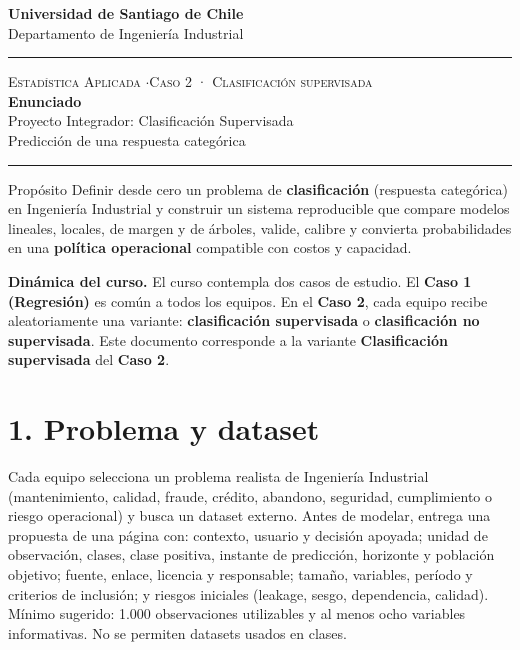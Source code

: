 \documentclass[11pt,letterpaper]{article}
\newcommand{\hrulethin}{\noindent\rule{\textwidth}{0.6pt}}
\begin{document}
\pagestyle{plain}
\begin{center}
    \textbf{\large Universidad de Santiago de Chile}\\[0.1cm]
    Departamento de Ingeniería Industrial
\end{center}
\vspace{0.15cm}\hrulethin\vspace{0.35cm}
\begin{center}
    {\scshape Estadística Aplicada \quad$\cdot$\quad Caso 2 · Clasificación supervisada}\\[0.35cm]
    {\LARGE \textbf{Enunciado}}\\[0.15cm]
    {\large Proyecto Integrador: Clasificación Supervisada}\\[0.2cm]
    Predicción de una respuesta categórica
\end{center}
\vspace{0.2cm}\hrulethin\vspace{0.4cm}
\begin{propbox}{Propósito}
Definir desde cero un problema de \textbf{clasificación} (respuesta categórica) en Ingeniería Industrial y
construir un sistema reproducible que compare modelos lineales, locales, de margen y de árboles, valide,
calibre y convierta probabilidades en una \textbf{política operacional} compatible con costos y capacidad.
\end{propbox}

\textbf{Dinámica del curso.} El curso contempla dos casos de estudio. El \textbf{Caso 1 (Regresión)} es común a todos los equipos. En el \textbf{Caso 2}, cada equipo recibe aleatoriamente una variante: \textbf{clasificación supervisada} o \textbf{clasificación no supervisada}. Este documento corresponde a la variante \textbf{Clasificación supervisada} del \textbf{Caso 2}.

\section*{1. Problema y dataset}
Cada equipo selecciona un problema realista de Ingeniería Industrial (mantenimiento, calidad, fraude, crédito, abandono, seguridad, cumplimiento o riesgo operacional) y busca un dataset externo. Antes de modelar, entrega una propuesta de una página con: contexto, usuario y decisión apoyada; unidad de observación, clases, clase positiva, instante de predicción, horizonte y población objetivo; fuente, enlace, licencia y responsable; tamaño, variables, período y criterios de inclusión; y riesgos iniciales (leakage, sesgo, dependencia, calidad). Mínimo sugerido: 1.000 observaciones utilizables y al menos ocho variables informativas. No se permiten datasets usados en clases.
\end{document}
